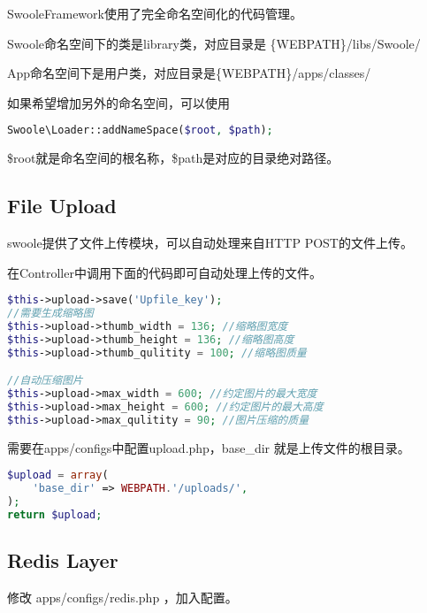 SwooleFramework使用了完全命名空间化的代码管理。

\begin{compactitem}
\item Swoole命名空间下的类是library类，对应目录是 \{WEBPATH\}/libs/Swoole/
\item App命名空间下是用户类，对应目录是\{WEBPATH\}/apps/classes/
\end{compactitem}


如果希望增加另外的命名空间，可以使用



\begin{lstlisting}[language=PHP]
Swoole\Loader::addNameSpace($root, $path);
\end{lstlisting}


\$root就是命名空间的根名称，\$path是对应的目录绝对路径。


\subsection{File Upload}


swoole提供了文件上传模块，可以自动处理来自HTTP POST的文件上传。

在Controller中调用下面的代码即可自动处理上传的文件。

\begin{lstlisting}[language=PHP]
$this->upload->save('Upfile_key');
//需要生成缩略图
$this->upload->thumb_width = 136; //缩略图宽度
$this->upload->thumb_height = 136; //缩略图高度
$this->upload->thumb_qulitity = 100; //缩略图质量

//自动压缩图片
$this->upload->max_width = 600; //约定图片的最大宽度
$this->upload->max_height = 600; //约定图片的最大高度
$this->upload->max_qulitity = 90; //图片压缩的质量
\end{lstlisting}


需要在apps/configs中配置upload.php，base\_dir 就是上传文件的根目录。

\begin{lstlisting}[language=PHP]
$upload = array(
    'base_dir' => WEBPATH.'/uploads/',
);
return $upload;
\end{lstlisting}


\subsection{Redis Layer}


修改 apps/configs/redis.php ，加入配置。




